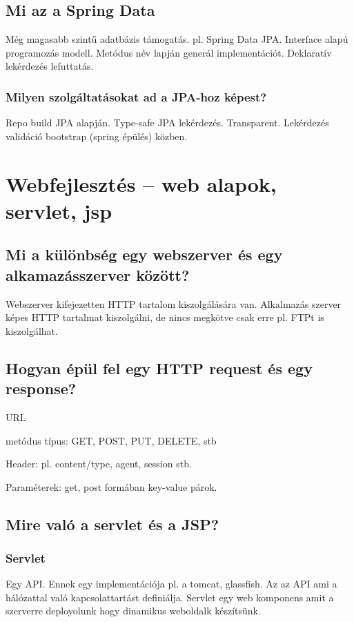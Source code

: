 \documentclass[a4paper,14pt]{extarticle}
\begin{document}
		\subsection{Mi az a Spring Data}
			Még magasabb szintű adatbázis támogatás. pl. Spring Data JPA.
			Interface alapú programozás modell.
			Metódus név lapján generál implementációt.
			Deklaratív lekérdezés lefuttatás.
			\subsubsection{Milyen szolgáltatásokat ad a JPA-hoz képest?}
			Repo build JPA alapján. Type-safe JPA lekérdezés.
			Transparent. Lekérdezés validáció bootstrap (spring épülés) közben.
	\section{Webfejlesztés – web alapok, servlet, jsp}
		\subsection{Mi a különbség egy webszerver és egy alkamazásszerver között?}
		Webszerver kifejezetten HTTP tartalom kiszolgálására van. Alkalmazás szerver képes HTTP tartalmat kiszolgálni, de nincs megkötve csak erre pl. FTPt is kiszolgálhat.
		\subsection{Hogyan épül fel egy HTTP request és egy response?}
		\begin{compactitem}
			\item URL
			\item metódus típus: GET, POST, PUT, DELETE, stb
			\item Header: pl. content/type, agent, session stb.
			\item Paraméterek: get, post formában key-value párok.
		\end{compactitem}

		\subsection{Mire való a servlet és a JSP?}
		\subsubsection{Servlet} Egy API. Ennek egy implementációja pl. a tomcat, glassfish. Az az API ami a hálózattal való kapcsolattartást definiálja.
		\newline Servlet egy web komponens amit a szerverre deployolunk hogy dinamikus weboldalk készítsünk.
\end{document}
